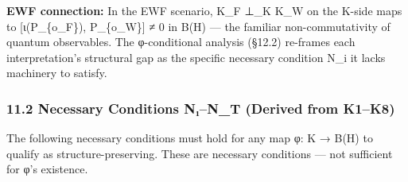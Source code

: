 \documentclass[
  11pt,
]{article}
\begin{document}
\textbf{EWF connection:} In the EWF scenario, K\_F ⊥\_K K\_W on the
K-side maps to {[}ι(P\_\{o\_F\}), P\_\{o\_W\}{]} ≠ 0 in B(H) --- the
familiar non-commutativity of quantum observables. The φ-conditional
analysis (§12.2) re-frames each interpretation's structural gap as the
specific necessary condition N\_i it lacks machinery to satisfy.

\subsubsection{11.2 Necessary Conditions N₁--N\_T (Derived from
K1--K8)}\label{necessary-conditions-nux2081n_t-derived-from-k1k8}

The following necessary conditions must hold for any map φ: K → B(H) to
qualify as structure-preserving. These are necessary conditions --- not
sufficient for φ's existence.
\end{document}
